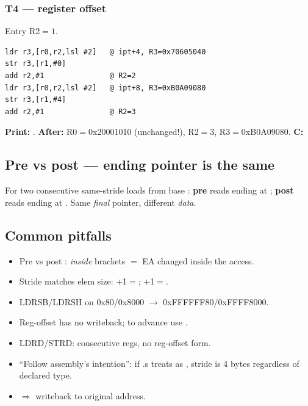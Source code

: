 \subsubsection*{T4 --- register offset }
Entry R2$=1$.
\begin{lstlisting}
ldr r3,[r0,r2,lsl #2]   @ ipt+4, R3=0x70605040
str r3,[r1,#0]
add r2,#1               @ R2=2
ldr r3,[r0,r2,lsl #2]   @ ipt+8, R3=0xB0A09080
str r3,[r1,#4]
add r2,#1               @ R2=3
\end{lstlisting}
\textbf{Print:} .\;
\textbf{After:} R0$=$0x20001010 (unchanged!), R2$=$3, R3$=$0xB0A09080.\;
\textbf{C:} 

\subsection{Pre vs post --- ending pointer is the same}
For two consecutive same-stride loads from base :
\textbf{pre} reads \asm{[Ra+s, Ra+2s]} ending at ;
\textbf{post} reads \asm{[Ra, Ra+s]} ending at .
Same \emph{final} pointer, different \emph{data}.

\subsection{Common pitfalls}
\begin{itemize}\setlength{\itemsep}{0pt}
\item Pre \asm{[Ra,\#os]!} vs post : \asm{!} \emph{inside}
      brackets $=$ EA changed inside the access.
\item Stride matches elem size: +1$=$;
      +1$=$.
\item LDRSB/LDRSH on 0x80/0x8000 $\to$ 0xFFFFFF80/0xFFFF8000.
\item Reg-offset has no writeback; to advance use
      .
\item LDRD/STRD: consecutive regs, no reg-offset form.
\item ``Follow assembly's intention'': if .s treats  as
      , stride is 4 bytes regardless of declared type.
\item {} $\Rightarrow$ 
      writeback to original address.
\end{itemize}

